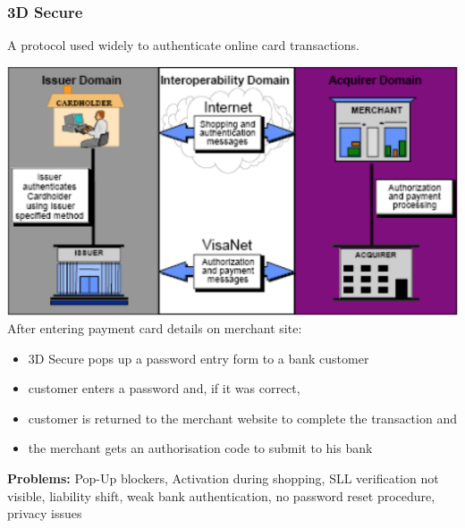 \documentclass[fs, footer]{latex4ei}
\begin{document}
\begin{multicols*}{4}
{	\subsubsection{3D Secure}
	A protocol used widely to authenticate online card transactions.

	\includegraphics[width=\columnwidth]{img/3DSecure.png}
	After entering payment card details on merchant site:
	\begin{itemize}
	\item 3D Secure pops up a password entry form to a bank customer
	\item customer enters a password and, if it was correct,
	\item customer is returned to the merchant website to complete the
	transaction and
	\item the merchant gets an authorisation code to submit to his bank
	\end{itemize}

	\textbf{Problems:} Pop-Up blockers, Activation during shopping, SLL verification not visible, liability shift, weak bank authentication, no password reset procedure, privacy issues\\
}
\end{multicols*}
\end{document}
